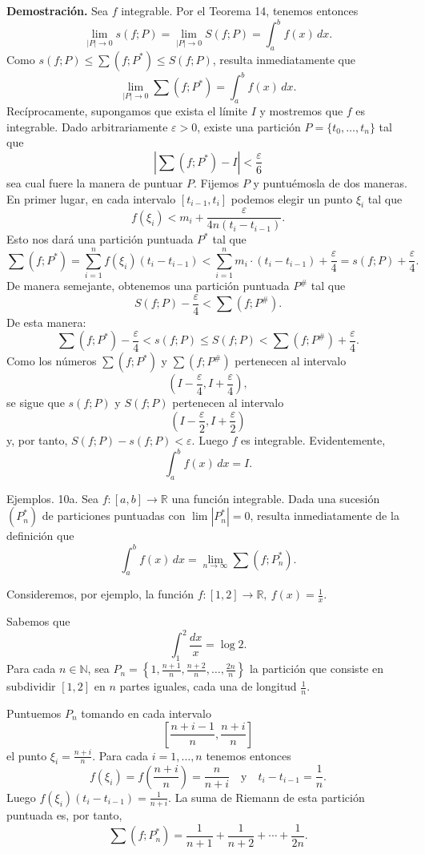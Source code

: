\documentclass[12pt,oneside]{book}
\begin{document}
\textbf{Demostración.} Sea \(f\) integrable. Por el Teorema 14, tenemos
entonces
\[
\lim_{|P| \to 0} s(f; P) = \lim_{|P| \to 0} S(f; P) = \int_a^b f(x) \, dx.
\]
Como \(s(f; P) \leq \sum (f; P^*) \leq S(f; P)\), resulta inmediatamente que
\[
\lim_{|P| \to 0} \sum (f; P^*) = \int_a^b f(x) \, dx.
\]
Recíprocamente, supongamos que exista el límite \(I\) y mostremos que \(f\) es integrable. Dado arbitrariamente \(\varepsilon > 0\), existe una partición \(P = \{t_0, \dots, t_n\}\) tal que
\[
\left| \sum (f; P^*) - I \right| < \frac{\varepsilon}{6}
\]
sea cual fuere la manera de puntuar \(P\). Fijemos \(P\) y puntuémosla de dos maneras. En primer lugar, en cada intervalo \([t_{i-1}, t_i]\) podemos elegir un punto \(\xi_i\) tal que
\[
f(\xi_i) < m_i + \frac{\varepsilon}{4n(t_i - t_{i-1})}.
\]
Esto nos dará una partición puntuada \(P^*\) tal que
\[
\sum (f; P^*) = \sum_{i=1}^n f(\xi_i)(t_i - t_{i-1})
< \sum_{i=1}^n m_i \cdot (t_i - t_{i-1}) + \frac{\varepsilon}{4}
= s(f; P) + \frac{\varepsilon}{4}.
\]
De manera semejante, obtenemos una partición puntuada \(P^{\#}\) tal que
\[
S(f; P) - \frac{\varepsilon}{4} < \sum (f; P^{\#}).
\]
De esta manera:
\[
\sum (f; P^*) - \frac{\varepsilon}{4} < s(f; P) \leq S(f; P) < \sum (f; P^{\#}) + \frac{\varepsilon}{4}.
\]
Como los números \(\sum (f; P^*)\) y \(\sum (f; P^{\#})\) pertenecen al intervalo
\[
\left( I - \frac{\varepsilon}{4}, I + \frac{\varepsilon}{4} \right),
\]
se sigue que \(s(f; P)\) y \(S(f; P)\) pertenecen al intervalo
\[
\left( I - \frac{\varepsilon}{2}, I + \frac{\varepsilon}{2} \right)
\]
y, por tanto, \(S(f; P) - s(f; P) < \varepsilon\). Luego \(f\) es integrable. Evidentemente,
\[
\int_a^b f(x) \, dx = I.
\]

Ejemplos.
10a. Sea \(f: [a, b] \to \mathbb{R}\) una función integrable. Dada una sucesión \((P_n^*)\) de particiones puntuadas con \(\lim |P_n^*| = 0\), resulta inmediatamente de la definición que
\[
\int_a^b f(x) \, dx = \lim_{n \to \infty} \sum (f; P_n^*).
\]

Consideremos, por ejemplo, la función \(f: [1, 2] \to \mathbb{R}, \ f(x) = \frac{1}{x}\).

Sabemos que
\[
\int_1^2 \frac{dx}{x} = \log 2.
\]
Para cada \(n \in \mathbb{N}\), sea \(P_n = \left\{ 1, \frac{n+1}{n}, \frac{n+2}{n}, \ldots, \frac{2n}{n} \right\}\) la partición que consiste en subdividir \([1, 2]\) en \(n\) partes iguales, cada una de longitud \(\frac{1}{n}\).

Puntuemos \(P_n\) tomando en cada intervalo
\[
\left[ \frac{n+i-1}{n}, \frac{n+i}{n} \right]
\]
el punto \(\xi_i = \frac{n+i}{n}\). Para cada \(i = 1, \ldots, n\) tenemos entonces
\[
f(\xi_i) = f\left( \frac{n+i}{n} \right) = \frac{n}{n+i}
\quad \text{y} \quad
t_i - t_{i-1} = \frac{1}{n}.
\]
Luego \(f(\xi_i)(t_i - t_{i-1}) = \frac{1}{n+i}\). La suma de Riemann de esta partición puntuada es, por tanto,
\[
\sum (f; P_n^*) = \frac{1}{n+1} + \frac{1}{n+2} + \cdots + \frac{1}{2n}.
\]
\end{document}
